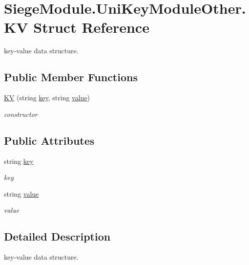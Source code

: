 \hypertarget{struct_siege_module_1_1_uni_key_module_other_1_1_k_v}{}\section{Siege\+Module.\+Uni\+Key\+Module\+Other.\+KV Struct Reference}
\label{struct_siege_module_1_1_uni_key_module_other_1_1_k_v}


key-\/value data structure.  


\subsection*{Public Member Functions}
\begin{DoxyCompactItemize}
\item 
\mbox{\hyperlink{struct_siege_module_1_1_uni_key_module_other_1_1_k_v_a70834c2e95d2cf14082fdcbef87c497b}{KV}} (string \mbox{\hyperlink{struct_siege_module_1_1_uni_key_module_other_1_1_k_v_ab66e165182f676a415d7800fa951e863}{key}}, string \mbox{\hyperlink{struct_siege_module_1_1_uni_key_module_other_1_1_k_v_a9c5e6ad07d2f59f4e7258904bc56d96d}{value}})
\begin{DoxyCompactList}\small\item\em constructor \end{DoxyCompactList}\end{DoxyCompactItemize}
\subsection*{Public Attributes}
\begin{DoxyCompactItemize}
\item 
string \mbox{\hyperlink{struct_siege_module_1_1_uni_key_module_other_1_1_k_v_ab66e165182f676a415d7800fa951e863}{key}}
\begin{DoxyCompactList}\small\item\em key \end{DoxyCompactList}\item 
string \mbox{\hyperlink{struct_siege_module_1_1_uni_key_module_other_1_1_k_v_a9c5e6ad07d2f59f4e7258904bc56d96d}{value}}
\begin{DoxyCompactList}\small\item\em value \end{DoxyCompactList}\end{DoxyCompactItemize}


\subsection{Detailed Description}
key-\/value data structure. 



